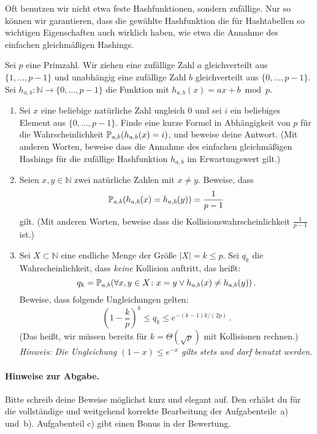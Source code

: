 \documentclass{uebung_cs}
\begin{document}
Oft benutzen wir nicht etwa feste Hashfunktionen, sondern zufällige.
Nur so können wir garantieren, dass die gewählte Hashfunktion die für Hashtabellen so wichtigen Eigenschaften auch wirklich haben, wie etwa die Annahme des einfachen gleichmäßigen Hashings.

Sei $p$ eine Primzahl.
Wir ziehen eine zufällige Zahl $a$ gleichverteilt aus $\{1,\dots,p-1\}$ und unabhängig eine zufällige Zahl $b$ gleichverteilt aus $\{0,\dots,p-1\}$.
Sei $h_{a,b}\colon\mathbb N\to\{0,\dots,p-1\}$ die Funktion mit $h_{a,b}(x)=ax+b\bmod p$.

\begin{enumerate}
    \item Sei $x$ eine beliebige natürliche Zahl ungleich $0$ und sei $i$ ein beliebiges Element aus $\{0,\dots,p-1\}$.
    Finde eine kurze Formel in Abhängigkeit von $p$ für die Wahrscheinlichkeit $\mathbb P_{a,b}(h_{a,b}(x)=i)$, und beweise deine Antwort. (Mit anderen Worten, beweise dass die Annahme des einfachen gleichmäßigen Hashings für die zufällige Hashfunktion $h_{a,b}$ im Erwartungswert gilt.)
    \item Seien $x,y\in\mathbb N$ zwei natürliche Zahlen mit $x\ne y$.
    Beweise, dass \[\mathbb P_{a,b}(h_{a,b}(x)=h_{a,b}(y))=\frac{1}{p-1}\] gilt. (Mit anderen Worten, beweise dass die Kollisionswahrscheinlichkeit $\frac{1}{p-1}$ ist.)
    \item Sei $X\subset\mathbb N$ eine endliche Menge der Größe $|X|=k\le p$. Sei $q_k$ die Wahrscheinlichkeit, dass \emph{keine} Kollision auftritt, das heißt:
    \[q_k=\mathbb P_{a,b}(\forall x,y\in X\colon x=y \vee h_{a,b}(x)\ne h_{a,b}(y))\,.\]
    Beweise, dass folgende Ungleichungen gelten:
    \[
        \left(1-\frac{k}{p}\right)^k\le q_k \leq e^{-(k-1)k/(2p)}\,.
    \]
    (Das heißt, wir müssen bereits für $k=\Theta(\sqrt{p})$ mit Kollisionen rechnen.)\\
    \emph{Hinweis: Die Ungleichung $(1-x)\le e^{-x}$ gilts stets und darf benutzt werden.}
\end{enumerate}

\paragraph*{Hinweise zur Abgabe.}
Bitte schreib deine Beweise möglichst kurz und elegant auf.
Den  erhälst du für die vollständige und weitgehend korrekte Bearbeitung der Aufgabenteile~a) und~b). Aufgabenteil c) gibt einen Bonus in der Bewertung.
\end{document}
